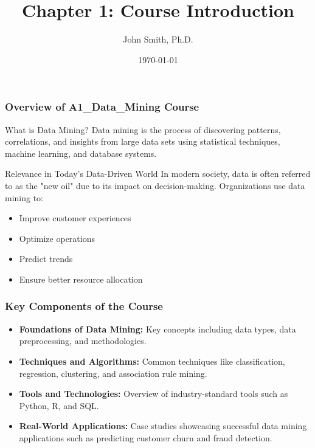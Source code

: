 \documentclass[aspectratio=169]{beamer}
\title[Course Introduction]{Chapter 1: Course Introduction}
\author[J. Smith]{John Smith, Ph.D.}
\date{\today}
\begin{document}
\frame{\titlepage}

\begin{frame}[fragile]
  \titlepage
\end{frame}

\begin{frame}[fragile]
  \frametitle{Overview of A1\_Data\_Mining Course}
  
  \begin{block}{What is Data Mining?}
    Data mining is the process of discovering patterns, correlations, and insights from large data sets using statistical techniques, machine learning, and database systems.
  \end{block}

  \begin{block}{Relevance in Today's Data-Driven World}
    In modern society, data is often referred to as the "new oil" due to its impact on decision-making. Organizations use data mining to:
    \begin{itemize}
        \item Improve customer experiences
        \item Optimize operations
        \item Predict trends
        \item Ensure better resource allocation
    \end{itemize}
  \end{block}
\end{frame}

\begin{frame}[fragile]
  \frametitle{Key Components of the Course}
  
  \begin{itemize}
    \item \textbf{Foundations of Data Mining:} Key concepts including data types, data preprocessing, and methodologies.
    \item \textbf{Techniques and Algorithms:} Common techniques like classification, regression, clustering, and association rule mining.
    \item \textbf{Tools and Technologies:} Overview of industry-standard tools such as Python, R, and SQL.
    \item \textbf{Real-World Applications:} Case studies showcasing successful data mining applications such as predicting customer churn and fraud detection.
  \end{itemize}
\end{frame}
\end{document}
